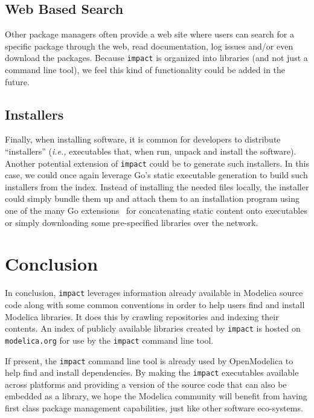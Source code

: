 \documentclass[11pt,a4paper,twocolumn]{article}
\newcommand{\code}[1]{\texttt{#1}} %
\begin{document}
\subsection{Web Based Search}

Other package managers often provide a web site where users can search
for a specific package through the web, read documentation, log issues
and/or even download the packages.  Because \code{impact} is organized
into libraries (and not just a command line tool), we feel this kind
of functionality could be added in the future.

\subsection{Installers}

Finally, when installing software, it is common for developers to
distribute ``installers'' (\emph{i.e.,} executables that, when run,
unpack and install the software).  Another potential extension of
\code{impact} could be to generate such installers.  In this case, we
could once again leverage Go's static executable generation to build
such installers from the index.  Instead of installing the needed
files locally, the installer could simply bundle them up and attach
them to an installation program using one of the many Go
extensions~\parencite{GeertJohan/go.rice,tebeka/nrsc}
for concatenating static content onto executables or simply
downloading some pre-specified libraries over the network.

\section{Conclusion}

In conclusion, \code{impact} leverages information already available
in Modelica source code along with some common conventions in order to
help users find and install Modelica libraries.  It does this by
crawling repositories and indexing their contents.  An index of
publicly available libraries created by \code{impact} is hosted on
\code{modelica.org} for use by the \code{impact} command line tool.

If present, the \code{impact} command line tool is already used by
OpenModelica to help find and install dependencies.  By making the
\code{impact} executables available across platforms and providing a
version of the source code that can also be embedded as a library, we
hope the Modelica community will benefit from having first class
package management capabilities, just like other software eco-systems.
\end{document}
